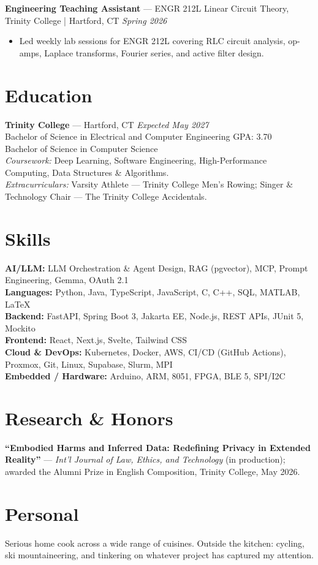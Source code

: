 \documentclass[10pt, letterpaper]{article}
\begin{document}
\vspace{1pt}\noindent
\textbf{Engineering Teaching Assistant} --- ENGR 212L Linear Circuit Theory, Trinity College | Hartford, CT
\hfill \textit{Spring 2026}
\begin{itemize}
  \item Led weekly lab sessions for ENGR 212L covering RLC circuit analysis, op-amps,
    Laplace transforms, Fourier series, and active filter design.
\end{itemize}

\section{Education}

\noindent
\textbf{Trinity College} --- Hartford, CT \hfill \textit{Expected May 2027}\\
Bachelor of Science in Electrical and Computer Engineering \hfill GPA: 3.70\\
Bachelor of Science in Computer Science\\
\textit{Coursework:} Deep Learning, Software Engineering, High-Performance Computing,
Data Structures \& Algorithms.\\
\textit{Extracurriculars:} Varsity Athlete --- Trinity College Men's Rowing;\quad
Singer \& Technology Chair --- The Trinity College Accidentals.

\section{Skills}

\noindent
\textbf{AI/LLM:} LLM Orchestration \& Agent Design, RAG (pgvector), MCP, Prompt Engineering,
Gemma, OAuth 2.1\\
\textbf{Languages:} Python, Java, TypeScript, JavaScript, C, C++, SQL, MATLAB, LaTeX\\
\textbf{Backend:} FastAPI, Spring Boot 3, Jakarta EE, Node.js, REST APIs, JUnit 5, Mockito\\
\textbf{Frontend:} React, Next.js, Svelte, Tailwind CSS\\
\textbf{Cloud \& DevOps:} Kubernetes, Docker, AWS, CI/CD (GitHub Actions), Proxmox, Git,
Linux, Supabase, Slurm, MPI\\
\textbf{Embedded / Hardware:} Arduino, ARM, 8051, FPGA, BLE 5, SPI/I2C

\section{Research \& Honors}

\noindent
\textbf{``Embodied Harms and Inferred Data: Redefining Privacy in Extended Reality''}
--- \textit{Int'l Journal of Law, Ethics, and Technology} (in production); awarded the
Alumni Prize in English Composition, Trinity College, May 2026.

\section{Personal}

\noindent
Serious home cook across a wide range of cuisines. Outside the kitchen: cycling, ski
mountaineering, and tinkering on whatever project has captured my attention.
\end{document}
